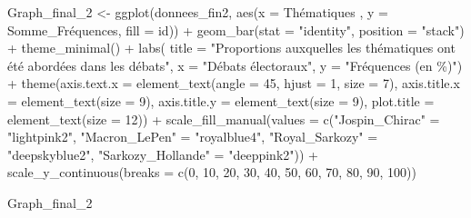 \documentclass[
  letterpaper,
  DIV=11,
  numbers=noendperiod]{scrartcl}
\newenvironment{Shaded}{\begin{snugshade}}{\end{snugshade}}
\newcommand{\AttributeTok}[1]{\textcolor[rgb]{0.40,0.45,0.13}{#1}}
\newcommand{\DecValTok}[1]{\textcolor[rgb]{0.68,0.00,0.00}{#1}}
\newcommand{\FunctionTok}[1]{\textcolor[rgb]{0.28,0.35,0.67}{#1}}
\newcommand{\NormalTok}[1]{\textcolor[rgb]{0.00,0.23,0.31}{#1}}
\newcommand{\OtherTok}[1]{\textcolor[rgb]{0.00,0.23,0.31}{#1}}
\newcommand{\SpecialCharTok}[1]{\textcolor[rgb]{0.37,0.37,0.37}{#1}}
\newcommand{\StringTok}[1]{\textcolor[rgb]{0.13,0.47,0.30}{#1}}
\begin{document}
\begin{Shaded}
\begin{Highlighting}[]
\NormalTok{Graph\_final\_2 }\OtherTok{\textless{}{-}} \FunctionTok{ggplot}\NormalTok{(donnees\_fin2, }\FunctionTok{aes}\NormalTok{(}\AttributeTok{x =}\NormalTok{ Thématiques , }\AttributeTok{y =}\NormalTok{ Somme\_Fréquences, }\AttributeTok{fill =}\NormalTok{ id)) }\SpecialCharTok{+} \FunctionTok{geom\_bar}\NormalTok{(}\AttributeTok{stat =} \StringTok{"identity"}\NormalTok{, }\AttributeTok{position =} \StringTok{"stack"}\NormalTok{) }\SpecialCharTok{+} \FunctionTok{theme\_minimal}\NormalTok{() }\SpecialCharTok{+} \FunctionTok{labs}\NormalTok{( }\AttributeTok{title =} \StringTok{"Proportions auxquelles les thématiques ont été abordées dans les débats"}\NormalTok{, }\AttributeTok{x =} \StringTok{"Débats électoraux"}\NormalTok{, }\AttributeTok{y =} \StringTok{"Fréquences (en \%)"}\NormalTok{) }\SpecialCharTok{+} \FunctionTok{theme}\NormalTok{(}\AttributeTok{axis.text.x =} \FunctionTok{element\_text}\NormalTok{(}\AttributeTok{angle =} \DecValTok{45}\NormalTok{, }\AttributeTok{hjust =} \DecValTok{1}\NormalTok{, }\AttributeTok{size =} \DecValTok{7}\NormalTok{), }\AttributeTok{axis.title.x =} \FunctionTok{element\_text}\NormalTok{(}\AttributeTok{size =} \DecValTok{9}\NormalTok{), }\AttributeTok{axis.title.y =} \FunctionTok{element\_text}\NormalTok{(}\AttributeTok{size =} \DecValTok{9}\NormalTok{), }\AttributeTok{plot.title =} \FunctionTok{element\_text}\NormalTok{(}\AttributeTok{size =} \DecValTok{12}\NormalTok{)) }\SpecialCharTok{+} \FunctionTok{scale\_fill\_manual}\NormalTok{(}\AttributeTok{values =} \FunctionTok{c}\NormalTok{(}\StringTok{"Jospin\_Chirac"} \OtherTok{=} \StringTok{"lightpink2"}\NormalTok{, }\StringTok{"Macron\_LePen"} \OtherTok{=} \StringTok{"royalblue4"}\NormalTok{, }\StringTok{"Royal\_Sarkozy"} \OtherTok{=} \StringTok{"deepskyblue2"}\NormalTok{, }\StringTok{"Sarkozy\_Hollande"} \OtherTok{=} \StringTok{"deeppink2"}\NormalTok{)) }\SpecialCharTok{+} \FunctionTok{scale\_y\_continuous}\NormalTok{(}\AttributeTok{breaks =} \FunctionTok{c}\NormalTok{(}\DecValTok{0}\NormalTok{, }\DecValTok{10}\NormalTok{, }\DecValTok{20}\NormalTok{, }\DecValTok{30}\NormalTok{, }\DecValTok{40}\NormalTok{, }\DecValTok{50}\NormalTok{, }\DecValTok{60}\NormalTok{, }\DecValTok{70}\NormalTok{, }\DecValTok{80}\NormalTok{, }\DecValTok{90}\NormalTok{, }\DecValTok{100}\NormalTok{))}

\NormalTok{Graph\_final\_2}
\end{Highlighting}
\end{Shaded}
\end{document}
